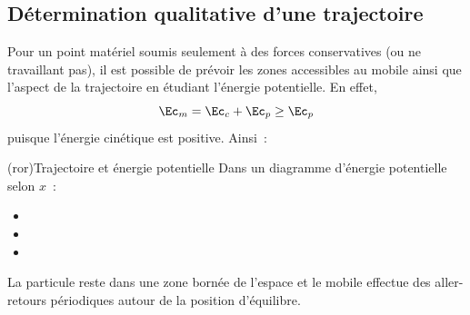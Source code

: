 \documentclass[../../main/main.tex]{subfiles}
\begin{document}
\subsection{Détermination qualitative d'une trajectoire}
Pour un point matériel soumis seulement à des forces conservatives (ou ne
travaillant pas), il est possible de prévoir les zones accessibles au mobile
ainsi que l'aspect de la trajectoire en étudiant l'énergie potentielle. En
effet,
\[\Ec_m = \Ec_c + \Ec_p \geq \Ec_p\]
puisque l'énergie cinétique est positive. Ainsi~:
\begin{tcb*}[breakable](ror){Trajectoire et énergie potentielle}
	Dans un diagramme d'énergie potentielle selon $x$~:
	\begin{itemize}
		\item {}
		\item {}
		\item {}
	\end{itemize}\bigbreak
	\begin{isd}
		La particule reste dans une zone bornée de l'espace et le mobile effectue
		des aller-retours périodiques autour de la position d'équilibre.
		\begin{center}
\end{center}
\end{isd}
\end{tcb*}
\end{document}
